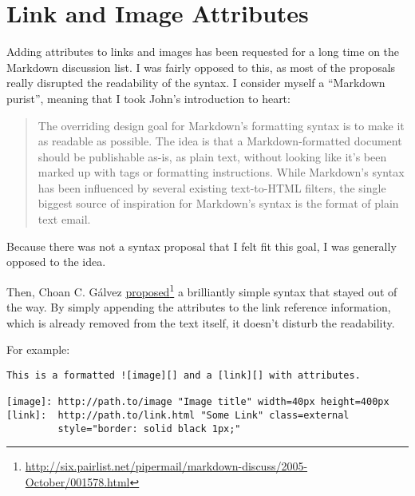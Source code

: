 
\def\mytitle{Link and Image Attributes}
\def\myauthor{Fletcher T. Penney}
\def\revised{2018-06-30}




\tableofcontents

\section{Link and Image Attributes}
\label{linkandimageattributes}

Adding attributes to links and images has been requested for a long time on
the Markdown discussion list. I was fairly opposed to this, as most of the
proposals really disrupted the readability of the syntax. I consider myself a
``Markdown purist'', meaning that I took John's introduction to heart:

\begin{quote}
The overriding design goal for Markdown's formatting syntax is to make
it as readable as possible. The idea is that a Markdown-formatted
document should be publishable as-is, as plain text, without looking
like it's been marked up with tags or formatting instructions. While
Markdown's syntax has been influenced by several existing text-to-HTML
filters, the single biggest source of inspiration for Markdown's
syntax is the format of plain text email.
\end{quote}

Because there was not a syntax proposal that I felt fit this goal, I was generally opposed to the idea.

Then, Choan C. Gálvez \href{http://six.pairlist.net/pipermail/markdown-discuss/2005-October/001578.html}{proposed}\footnote{\href{http://six.pairlist.net/pipermail/markdown-discuss/2005-October/001578.html}{http:\slash \slash six.pairlist.net\slash pipermail\slash markdown-discuss\slash 2005-October\slash 001578.html}} a brilliantly simple syntax that
stayed out of the way. By simply appending the attributes to the link
reference information, which is already removed from the text itself, it
doesn't disturb the readability.

For example:

\begin{verbatim}
This is a formatted ![image][] and a [link][] with attributes.

[image]: http://path.to/image "Image title" width=40px height=400px
[link]:  http://path.to/link.html "Some Link" class=external
         style="border: solid black 1px;"
\end{verbatim}

